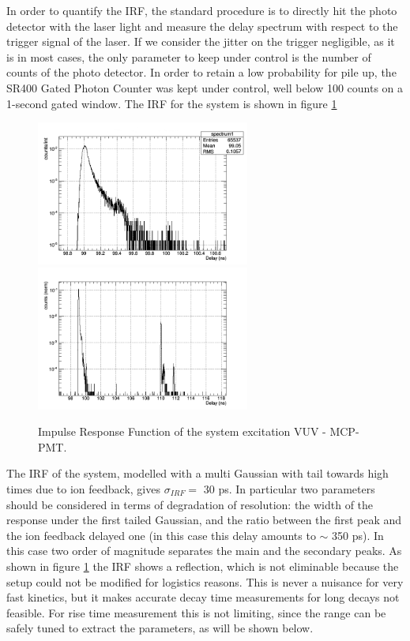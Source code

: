In order to quantify the IRF, the standard procedure is to directly hit the photo detector with the laser light and measure the delay spectrum with respect to the trigger signal of the laser.
If we consider the jitter on the trigger negligible, as it is in most cases, the only parameter to keep under control is the number of counts of the photo detector. 
In order to retain a low probability for pile up, the SR400 Gated Photon Counter was kept under control, well below 100 counts on a 1-second gated window. 
The IRF for the system is shown in figure \ref{fig:IRF}
\begin{figure}[htbp]
\begin{center}
\includegraphics[width=7cm]{../Pictures/Chapter_7/IRF_simple.png}
\includegraphics[width=7cm]{../Pictures/Chapter_7/long.png}
\end{center}
\caption[VUV setup IRF]{Impulse Response Function of the system excitation VUV - MCP-PMT.}
\label{fig:IRF}
\end{figure}
The IRF of the system, modelled with a multi Gaussian with tail towards high times due to ion feedback, gives $\sigma _{IRF} = $ 30 ps.
In particular two parameters should be considered in terms of degradation of resolution: the width of the response under the first tailed Gaussian, and the ratio between the first peak and the ion feedback delayed one (in this case this delay amounts to $\sim$ 350 ps). In this case two order of magnitude separates the main and the secondary peaks.
As shown in figure \ref{fig:IRF} the IRF shows a reflection, which is not eliminable because the setup could not be modified for logistics reasons. This is never a nuisance for very fast kinetics, but it makes accurate decay time measurements for long decays not feasible. For rise time measurement this is not limiting, since the range can be safely tuned to extract the parameters, as will be shown below. 

